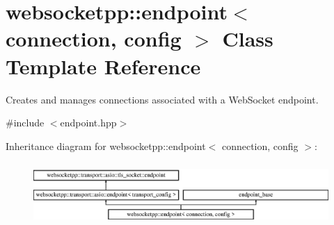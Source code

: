 \hypertarget{classwebsocketpp_1_1endpoint}{}\section{websocketpp\+:\+:endpoint$<$ connection, config $>$ Class Template Reference}
\label{classwebsocketpp_1_1endpoint}


Creates and manages connections associated with a Web\+Socket endpoint.  




{\ttfamily \#include $<$endpoint.\+hpp$>$}

Inheritance diagram for websocketpp\+:\+:endpoint$<$ connection, config $>$\+:\begin{figure}[H]
\begin{center}
\leavevmode
\includegraphics[height=2.413793cm]{classwebsocketpp_1_1endpoint}
\end{center}
\end{figure}
